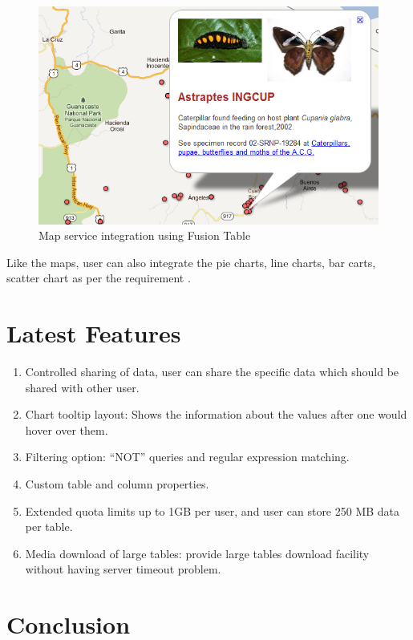 \documentclass[9pt,twocolumn,twoside]{styles/osajnl}
\begin{document}
\begin{figure}[htbp]
	\centering
	\includegraphics[width=\linewidth]{images/ft_mapresult}
	\caption{Map service integration using Fusion Table \cite{www-8} }
	\label{fig:false-color}
\end{figure}


Like the maps, user can also integrate the pie charts, line charts, bar carts, scatter chart as per the requirement . 


\section{Latest Features}

\begin{enumerate}
	\item Controlled sharing of data, user can share the specific data which should be shared with other user.
	\item Chart tooltip layout: Shows the information about the values after one would hover over them.
	\item Filtering option: “NOT” queries and regular expression matching. 
	\item Custom table and column properties.
	\item Extended quota limits up to 1GB per user, and user can store 250 MB data per table.
	\item Media download of large tables: provide large tables download facility without having server timeout problem.

\end{enumerate}


\section{Conclusion}
\end{document}
